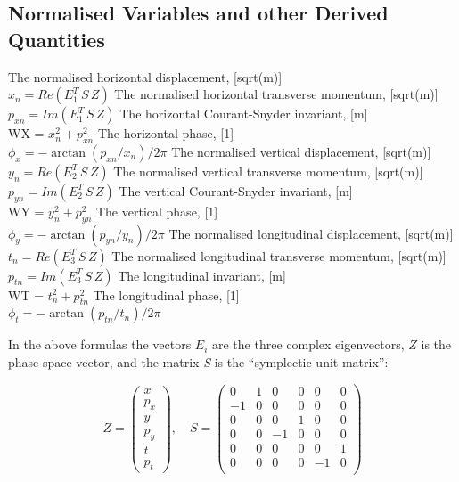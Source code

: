 \subsection{Normalised Variables and other Derived Quantities}
\label{subsec:tables-normal}
\begin{madlist}
   The normalised horizontal displacement, [sqrt(m)]\\
  $x_n = Re ( E_1^T \, S\, Z )$
   The normalised horizontal transverse momentum, [sqrt(m)]\\
  $p_{xn} = Im ( E_1^T\, S\, Z )$
   The horizontal Courant-Snyder invariant, [m]\\
  WX = $x_n^2 + p_{xn}^2$
   The horizontal phase, [1]\\
  $\phi_x = -\arctan ( p_{xn} / x_n ) / 2 \pi$
   The normalised vertical displacement, [sqrt(m)]\\
  $y_n = Re ( E_2^T \,S\, Z )$
   The normalised vertical transverse momentum, [sqrt(m)]\\
  $p_{yn} = Im ( E_2^T\, S\, Z )$
   The vertical Courant-Snyder invariant, [m]\\
  WY = $y_n^2 + p_{yn}^2$
   The vertical phase, [1]\\
  $\phi_y = -\arctan ( p_{yn} / y_n ) / 2 \pi$
   The normalised longitudinal displacement, [sqrt(m)]\\
  $t_n = Re ( E_3^T \,S\, Z )$
   The normalised longitudinal transverse momentum, [sqrt(m)]\\
  $p_{tn} = Im ( E_3^T\, S\, Z )$
   The longitudinal invariant, [m]\\
  WT = $t_n^2 + p_{tn}^2$
   The longitudinal phase, [1]\\
  $\phi_t = - \arctan ( p_{tn} / t_n ) / 2 \pi$
\end{madlist} 

In the above formulas the vectors \(E_i\) are the three complex
eigenvectors, \(Z\) is the phase space vector, and the matrix \textit{S}
is the ``symplectic unit matrix'':   

\begin{equation}
Z = \left(
\begin{array}{l} x \\ p_x \\ y \\ p_y \\ t \\ p_t
\end{array} \right), \quad
S =
 \begin{pmatrix}
  0 & 1 & 0 & 0 & 0 & 0 \\
  -1 & 0 & 0 & 0 & 0 & 0 \\
  0 & 0 & 0 & 1 & 0 & 0 \\
  0 & 0 & -1 & 0 & 0 & 0 \\
  0 & 0 & 0 & 0 & 0 & 1 \\
  0 & 0 & 0 & 0 & -1 & 0 \\
 \end{pmatrix}
\end{equation}


